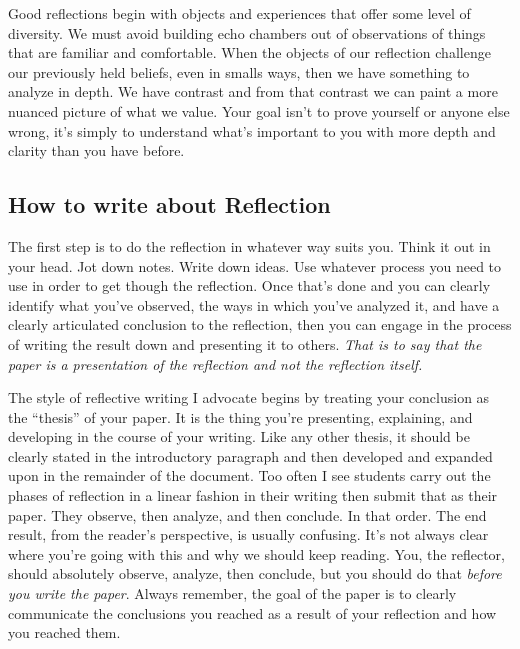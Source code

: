 \documentclass[nobib]{tufte-handout}
\begin{document}
Good reflections begin with objects and experiences that offer some level of diversity. We must avoid building echo chambers out of observations of things that are familiar and comfortable.  When the objects of our reflection challenge our previously held beliefs, even in smalls ways, then we have something to analyze in depth. We have contrast and from that contrast we can paint a more nuanced picture of what we value. Your goal isn't to prove yourself or anyone else wrong, it's simply to understand what's important to you with more depth and clarity than you have before.


\subsection*{How to write about Reflection}

The first step is to do the reflection in whatever way suits you. Think it out in your head. Jot down notes. Write down ideas. Use whatever process you need to use in order to get though the reflection. Once that's done and you can clearly identify what you've observed, the ways in which you've analyzed it, and have a clearly articulated conclusion to the reflection, then you can engage in the process of writing the result down and presenting it to others. \textit{That is to say that the paper is a presentation of the reflection and not the reflection itself.}

The style of reflective writing I advocate begins by treating your conclusion as the ``thesis'' of your paper. It is the thing you're presenting, explaining, and developing in the course of your writing. Like any other thesis, it should be clearly stated in the introductory paragraph and then developed and expanded upon in the remainder of the document. Too often I see students carry out the phases of reflection in a linear fashion in their writing then submit that as their paper.  They observe, then analyze, and then conclude.  In that order. The end result, from the reader's perspective, is usually confusing. It's not always clear where you're going with this and why we should keep reading. You, the reflector, should absolutely observe, analyze, then conclude, but you should do that \textit{before you write the paper}.  Always remember, the goal of the paper is to clearly communicate the conclusions you reached as a result of your reflection and how you reached them.
\end{document}
